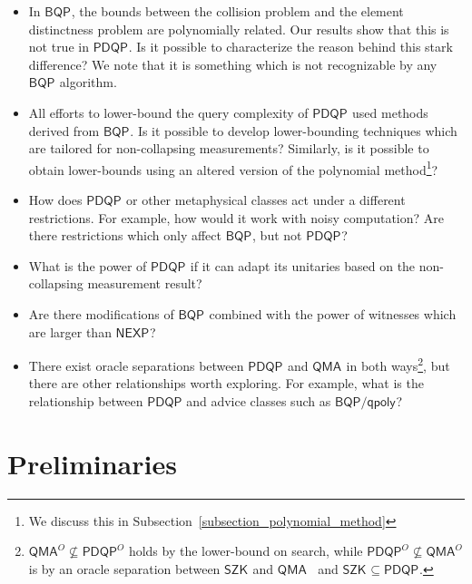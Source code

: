 \documentclass[10pt,a4paper]{article}
\newcommand{\compclass}[2][]{\ensuremath{\mathsf{#2}^{#1}}\xspace}
\newcommand{\pdqpname}[0]{\compclass{PDQP}}
\newcommand{\bqpname}[0]{\compclass{BQP}}
\begin{document}
\begin{itemize}
    \item In \bqpname, the bounds between the collision problem and the element distinctness problem are polynomially related. Our results show that this is not true in \pdqpname. Is it possible to characterize the reason behind this stark difference? We note that it is something which is not recognizable by any \bqpname algorithm.
    \item All efforts to lower-bound the query complexity of \pdqpname used methods derived from \bqpname. Is it possible to develop lower-bounding techniques which are tailored for non-collapsing measurements? Similarly, is it possible to obtain lower-bounds using an altered version of the polynomial method\footnote{We discuss this in Subsection~\ref{subsection_polynomial_method}}?
    \item How does \pdqpname or other metaphysical classes act under a different restrictions. For example, how would it work with noisy computation? Are there restrictions which only affect \bqpname, but not \pdqpname?
    \item What is the power of \pdqpname if it can adapt its unitaries based on the non-collapsing measurement result?
    \item Are there modifications of \bqpname combined with the power of witnesses which are larger than \compclass{NEXP}?
    \item There exist oracle separations between \pdqpname and \compclass{QMA} in both ways\footnote{$\compclass[O]{QMA}\not \subseteq \compclass[O]{PDQP}$ holds by the lower-bound on search, while $\compclass[O]{PDQP}\not \subseteq \compclass[O]{QMA}$ is by an oracle separation between \compclass{SZK} and \compclass{QMA}~\cite{szk_qma_oracle_separation} and $\compclass{SZK}\subseteq \pdqpname$.}, but there are other relationships worth exploring. For example, what is the relationship between $\mathsf{PDQP}$ and advice classes such as $\compclass{BQP/qpoly}$?
\end{itemize}
 
\section{Preliminaries}
\end{document}
